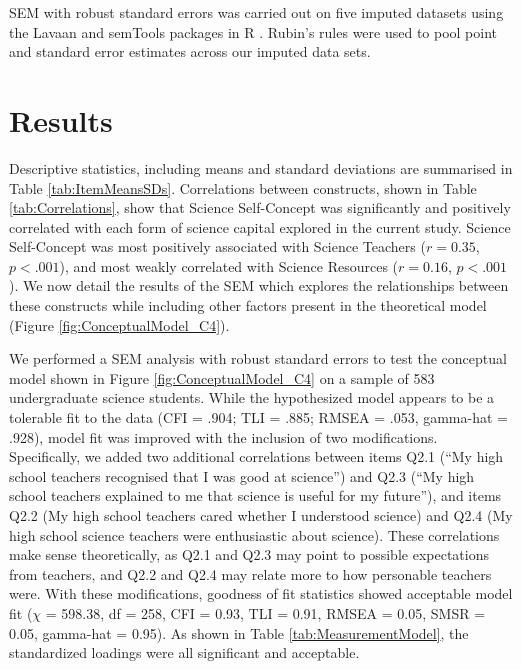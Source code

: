 SEM with robust standard errors \citep{huber1967behavior,white1982maximum} was carried out on five imputed datasets using the Lavaan \citep{rosseel2012lavaan} and semTools \citep{jorgensen2018package} packages in R \citep{team2013r}. Rubin's rules \citep{rubin2004multiple} were used to pool point and standard error estimates across our imputed data sets. 

\section*{Results}
\label{results}
Descriptive statistics, including means and standard deviations are summarised in Table \ref{tab:ItemMeansSDs}. Correlations between constructs, shown in Table \ref{tab:Correlations}, show that Science Self-Concept was significantly and positively correlated with each form of science capital explored in the current study. Science Self-Concept was most positively associated with Science Teachers ($r = 0.35$, $p<.001$), and most weakly correlated with Science Resources ($r = 0.16$, $p<.001$). We now detail the results of the SEM which explores the relationships between these constructs while including other factors present in the theoretical model (Figure \ref{fig:ConceptualModel_C4}).

We performed a SEM analysis with robust standard errors to test the conceptual model shown in Figure \ref{fig:ConceptualModel_C4} on a sample of 583 undergraduate science students. While the hypothesized model appears to be a tolerable fit to the data (CFI = .904; TLI = .885;  RMSEA = .053, gamma-hat =  .928), model fit was improved with the inclusion of two modifications. Specifically, we added two additional correlations between items Q2.1 (``My high school teachers recognised that I was good at science'') and Q2.3 (``My high school teachers explained to me that science is useful for my future''), and items Q2.2 (My high school teachers cared whether I understood science) and Q2.4 (My  high  school  science  teachers  were enthusiastic about science). These correlations make sense theoretically, as Q2.1 and Q2.3 may point to possible expectations from teachers, and Q2.2 and Q2.4 may relate more to how personable teachers were. With these modifications, goodness of fit statistics showed acceptable model fit \citep{hu1999cutoff,steiger2007understanding} ($\chi$ = 598.38, df = 258, CFI = 0.93, TLI = 0.91, RMSEA = 0.05, SMSR = 0.05, gamma-hat = 0.95). As shown in Table \ref{tab:MeasurementModel}, the standardized loadings were all significant and acceptable. 

